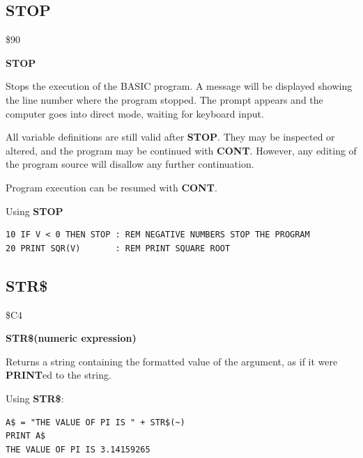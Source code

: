
\newpage
\subsection{STOP}
\begin{description}[leftmargin=2cm,style=nextline]
\item [Token:] \$90
\item [Format:] {\bf STOP}
\item [Usage:] Stops the execution
               of the BASIC program.
               A message will be displayed showing the line number where the program stopped.
               The  prompt
               appears and the computer goes into direct mode,
               waiting for keyboard input.

\item [Remarks:]
               All variable definitions are still valid after {\bf STOP}.
               They may be inspected or altered, and the
               program may be continued with {\bf CONT}.
               However, any editing of the program source
               will disallow any further continuation.

               Program execution can be resumed with {\bf CONT}.


\item [Example:] Using {\bf STOP}
\begin{tcolorbox}[colback=black,coltext=white]
\verbatimfont{\codefont}
\begin{verbatim}
10 IF V < 0 THEN STOP : REM NEGATIVE NUMBERS STOP THE PROGRAM
20 PRINT SQR(V)       : REM PRINT SQUARE ROOT
\end{verbatim}
\end{tcolorbox}
\end{description}


\newpage
\subsection{STR\$}
\begin{description}[leftmargin=2cm,style=nextline]
\item [Token:] \$C4
\item [Format:] {\bf STR\$(numeric expression)}
\item [Usage:] Returns a string
               containing the formatted value of the argument,
               as if it were {\bf PRINT}ed to the string.

\item [Example:] Using {\bf STR\$}:
\begin{tcolorbox}[colback=black,coltext=white]
\verbatimfont{\codefont}
\begin{verbatim}
A$ = "THE VALUE OF PI IS " + STR$(~)
PRINT A$
THE VALUE OF PI IS 3.14159265
\end{verbatim}
\end{tcolorbox}
\end{description}

